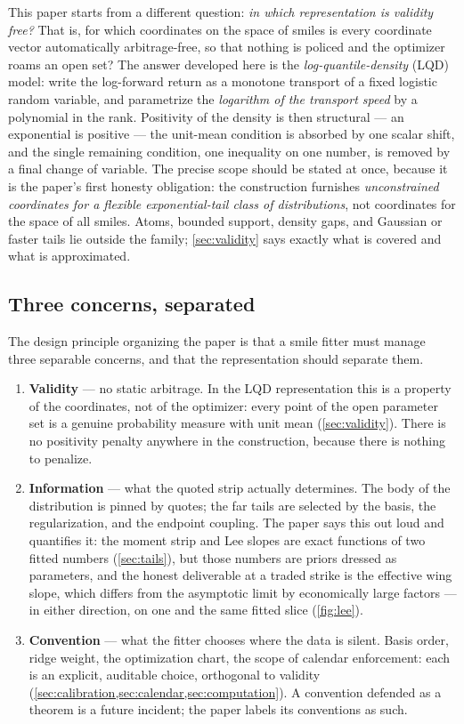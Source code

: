 This paper starts from a different question: \emph{in which representation
is validity free?}  That is, for which coordinates on the space of smiles is
every coordinate vector automatically arbitrage-free, so that nothing is
policed and the optimizer roams an open set?  The answer developed here is
the \emph{log-quantile-density} (LQD) model: write the log-forward return as
a monotone transport of a fixed logistic random variable, and parametrize
the \emph{logarithm of the transport speed} by a polynomial in the rank.
Positivity of the density is then structural --- an exponential is positive
--- the unit-mean condition is absorbed by one scalar shift, and the single
remaining condition, one inequality on one number, is removed by a final
change of variable.  The precise scope should be stated at once, because it
is the paper's first honesty obligation: the construction furnishes
\emph{unconstrained coordinates for a flexible exponential-tail class of
distributions}, not coordinates for the space of all smiles.  Atoms, bounded
support, density gaps, and Gaussian or faster tails lie outside the family;
\cref{sec:validity} says exactly what is covered and what is approximated.

\subsection{Three concerns, separated}

The design principle organizing the paper is that a smile fitter must manage
three separable concerns, and that the representation should separate them.

\begin{enumerate}[leftmargin=1.6em]
\item \textbf{Validity} --- no static arbitrage.  In the LQD representation
this is a property of the coordinates, not of the optimizer: every point of
the open parameter set is a genuine probability measure with unit mean
(\cref{sec:validity}).  There is no positivity penalty anywhere in the
construction, because there is nothing to penalize.
\item \textbf{Information} --- what the quoted strip actually determines.
The body of the distribution is pinned by quotes; the far tails are selected
by the basis, the regularization, and the endpoint coupling.  The paper says
this out loud and quantifies it: the moment strip and Lee slopes are exact
functions of two fitted numbers (\cref{sec:tails}), but those numbers are
priors dressed as parameters, and the honest deliverable at a traded strike
is the effective wing slope, which differs from the asymptotic limit by
economically large factors --- in either direction, on one and the same
fitted slice (\cref{fig:lee}).
\item \textbf{Convention} --- what the fitter chooses where the data is
silent.  Basis order, ridge weight, the optimization chart, the scope of
calendar enforcement: each is an explicit, auditable choice, orthogonal to
validity (\cref{sec:calibration,sec:calendar,sec:computation}).  A
convention defended as a theorem is a future incident; the paper labels its
conventions as such.
\end{enumerate}

